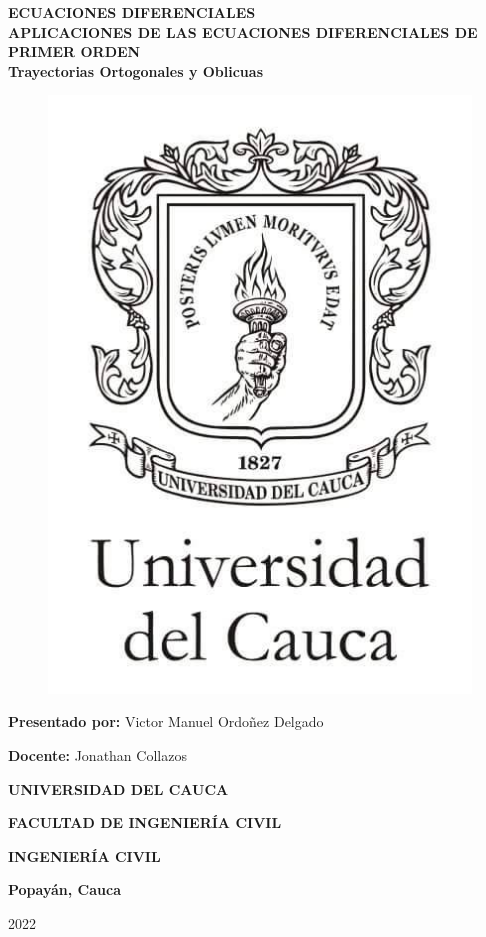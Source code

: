 \documentclass[12pt,letterpaper]{article}
\begin{document}
\begin{titlepage}
\begin{center}



{ \LARGE \textbf{ECUACIONES DIFERENCIALES}} \\
\vspace{0.5cm}
{\large \textbf{APLICACIONES DE LAS ECUACIONES DIFERENCIALES DE PRIMER ORDEN}} \\
\vspace{0.2cm}
{\normalsize \textbf{Trayectorias Ortogonales y Oblicuas}} \\
\begin{figure}[h]
\centering
\includegraphics[scale=0.5]{Logo Uni}
\end{figure}
\textbf{Presentado por:} Victor Manuel Ordoñez Delgado \par
\vspace{0.5cm}
\textbf{Docente:} Jonathan Collazos \par
\vspace{2cm}
\textbf{UNIVERSIDAD DEL CAUCA}\par
\vspace{0.5cm}
\textbf{FACULTAD DE INGENIERÍA CIVIL} \par
\vspace{0.5cm}
\textbf{INGENIERÍA CIVIL} \par
\vspace{0.5cm}
\textbf{Popayán, Cauca} \par
\vspace{0.5cm}
2022 \par

\end{center}
\end{titlepage}
\end{document}
